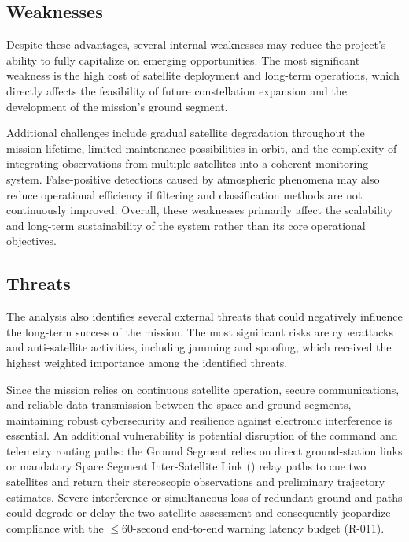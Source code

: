 \subsection{Weaknesses}

Despite these advantages, several internal weaknesses may reduce the project's ability to fully capitalize on emerging opportunities. The most significant weakness is the high cost of satellite deployment and long-term operations, which directly affects the feasibility of future constellation expansion and the development of the mission's ground segment.

Additional challenges include gradual satellite degradation throughout the mission lifetime, limited maintenance possibilities in orbit, and the complexity of integrating observations from multiple satellites into a coherent monitoring system. False-positive detections caused by atmospheric phenomena may also reduce operational efficiency if filtering and classification methods are not continuously improved. Overall, these weaknesses primarily affect the scalability and long-term sustainability of the system rather than its core operational objectives.

\subsection{Threats}

The analysis also identifies several external threats that could negatively influence the long-term success of the mission. The most significant risks are cyberattacks and anti-satellite activities, including jamming and spoofing, which received the highest weighted importance among the identified threats.

Since the mission relies on continuous satellite operation, secure communications, and reliable data transmission between the space and ground segments, maintaining robust cybersecurity and resilience against electronic interference is essential. An additional vulnerability is potential disruption of the command and telemetry routing paths: the Ground Segment relies on direct ground-station links or mandatory Space Segment Inter-Satellite Link () relay paths to cue two  satellites and return their stereoscopic observations and preliminary trajectory estimates. Severe interference or simultaneous loss of redundant ground and  paths could degrade or delay the two-satellite assessment and consequently jeopardize compliance with the $\le 60\text{-second}$ end-to-end warning latency budget (R-011).

